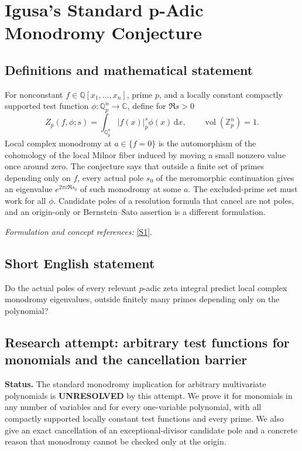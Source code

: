\documentclass[11pt]{article}
\begin{document}
\section*{\texorpdfstring{Igusa’s Standard p-Adic Monodromy Conjecture}{Igusa’s Standard p-Adic Monodromy Conjecture}}\label{statement}
\subsection{Definitions and mathematical statement}
For nonconstant $f\in{\mathbb{Q}}[x_1,\ldots,x_n]$, prime $p$, and a locally constant compactly supported test function $\phi:{\mathbb{Q}}_p^n\to{\mathbb{C}}$, define for $\Re s>0$
\[
 Z_p(f,\phi;s)=\int_{{\mathbb{Q}}_p^n}|f(x)|_p^s\phi(x){\,\mathrm{d}} x,
 \qquad\operatorname{vol}({\mathbb{Z}}_p^n)=1.
\]
Local complex monodromy at $a\in\{f=0\}$ is the automorphism of the cohomology of the local Milnor fiber induced by moving a small nonzero value once around zero. The conjecture says that outside a finite set of primes depending only on $f$, every actual pole $s_0$ of the meromorphic continuation gives an eigenvalue $e^{2\pi i\Re s_0}$ of such monodromy at some $a$. The excluded-prime set must work for all $\phi$. Candidate poles of a resolution formula that cancel are not poles, and an origin-only or Bernstein--Sato assertion is a different formulation.
\par\smallskip\textit{Formulation and concept references:} \href{https://arxiv.org/pdf/2403.03343}{[S1]}.

\subsection{Short English statement}
Do the actual poles of every relevant $p$-adic zeta integral predict local complex monodromy eigenvalues, outside finitely many primes depending only on the polynomial?
\subsection{Research attempt: arbitrary test functions for monomials and the cancellation barrier}
\textbf{Status.} The standard monodromy implication for arbitrary multivariate polynomials is \textbf{UNRESOLVED} by this attempt. We prove it for monomials in any number of variables and for every one-variable polynomial, with all compactly supported locally constant test functions and every prime. We also give an exact cancellation of an exceptional-divisor candidate pole and a concrete reason that monodromy cannot be checked only at the origin.
\end{document}
